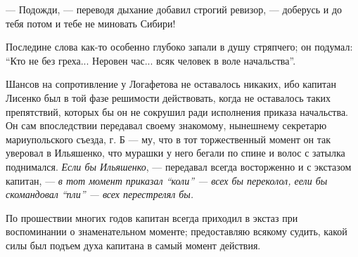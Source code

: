\documentclass[a4paper,20pt]{article}
\begin{document}
— Подожди, — переводя дыхание добавил строгий ревизор, — доберусь и до тебя потом и тебе не миновать Сибири!

Последине слова как-то особенно глубоко запали в
душу стряпчего; он подумал: ``Кто не без греха... Неровен час... всяк человек 
в воле начальства''.

Шансов на сопротивление у Логафетова не оставалось
никаких, ибо капитан Лисенко был в той фазе решимости действовать, 
когда не оставалось таких препятствий,
которых бы он не сокрушил ради исполнения приказа начальства. Он сам впоследствии передавал 
своему знакомому, нынешнему секретарю мариупольского съезда, г. Б — му,
что в тот торжественный момент он так уверовал в
Ильяшенко, что мурашки у него бегали по спине и волос
с затылка поднимался. \emph{Если бы Ильяшенко}, — передавал
всегда восторженно и с экстазом капитан, — \emph{в тот момент приказал ``коли'' — всех бы переколол, еели бы
скомандовал ``пли'' — всех перестрелял бы.}

По прошествии многих годов капитан всегда приходил в экстаз при воспоминании 
о знаменательном моменте; предоставляю всякому судить, какой силы был подъем духа 
капитана в самый момент действия.
\end{document}
